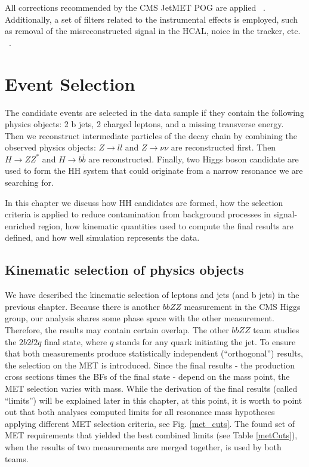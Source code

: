 All corrections recommended by the CMS JetMET POG are applied ~\cite{MissingETRun2Corrections}. Additionally, a set of filters related to the instrumental effects is employed, such as removal of the misreconstructed signal in the HCAL, noice in the tracker, etc. ~\cite{MissingETOptionalFiltersRun2}. 

\section{Event Selection}\label{sec:selection}

The candidate events are selected in the data sample if they contain the following physics objects: 2 b jets, 2 charged leptons, and a missing transverse energy. Then we reconstruct intermediate particles of the decay chain by combining the observed physics objects: $Z \to ll$ and $Z \to \nu \nu$ are reconstructed first. Then $H \to ZZ^*$ and $H \to b\bar{b}$ are reconstructed. Finally, two Higgs boson candidate are used to form the HH system that could originate from a narrow resonance we are searching for.

In this chapter we discuss how HH candidates are formed, how the selection criteria is applied to reduce contamination from background processes in signal-enriched region, how kinematic quantities used to compute the final results are defined, and how well simulation represents the data.

\subsection{Kinematic selection of physics objects}
We have described the kinematic selection of leptons and jets (and b jets) in the previous chapter. Because there is another $bbZZ$ measurement in the CMS Higgs group, our analysis shares some phase space with the other measurement. Therefore, the results may contain certain overlap. The other $bbZZ$ team studies the $2 b 2 l 2 q$ final state, where $q$ stands for any quark initiating the jet. To ensure that both measurements produce statistically independent (``orthogonal'') results, the selection on the MET is introduced. Since the final results - the production cross sections times the BFs of the final state - depend on the mass point, the MET selection varies with mass. While the derivation of the final results (called ``limits'') will be explained later in this chapter, at this point, it is worth to point out that both analyses computed limits for all resonance mass hypotheses applying different MET selection criteria, see Fig. \ref{met_cuts}. The found set of MET requirements that yielded the best combined limits (see Table \ref{metCuts}), when the results of two measurements are merged together, is used by both teams. 

